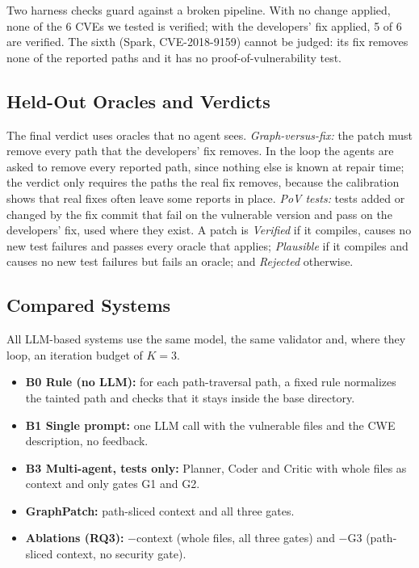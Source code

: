 \documentclass[conference]{IEEEtran}
\begin{document}
Two harness checks guard against a broken pipeline. With no change applied, none of the
6 CVEs we tested is verified; with the developers' fix applied, 5 of 6 are verified. The
sixth (Spark, CVE-2018-9159) cannot be judged: its fix removes none of the reported
paths and it has no proof-of-vulnerability test.

\subsection{Held-Out Oracles and Verdicts}
\label{sec:oracles}
The final verdict uses oracles that no agent sees. \emph{Graph-versus-fix:} the patch
must remove every path that the developers' fix removes. In the loop the agents are
asked to remove every reported path, since nothing else is known at repair time; the
verdict only requires the paths the real fix removes, because the calibration shows that
real fixes often leave some reports in place. \emph{PoV tests:} tests added or changed
by the fix commit that fail on the vulnerable version and pass on the developers' fix,
used where they exist. A patch is \emph{Verified} if it compiles, causes no new test
failures and passes every oracle that applies; \emph{Plausible} if it compiles and causes
no new test failures but fails an oracle; and \emph{Rejected} otherwise.

\subsection{Compared Systems}
All LLM-based systems use the same model, the same validator and, where they loop, an
iteration budget of $K=3$.
\begin{itemize}
\item \textbf{B0 Rule (no LLM):} for each path-traversal path, a fixed rule normalizes
the tainted path and checks that it stays inside the base directory.
\item \textbf{B1 Single prompt:} one LLM call with the vulnerable files and the CWE
description, no feedback.
\item \textbf{B3 Multi-agent, tests only:} Planner, Coder and Critic with whole files as
context and only gates G1 and G2.
\item \textbf{GraphPatch:} path-sliced context and all three gates.
\item \textbf{Ablations (RQ3):} $-$context (whole files, all three gates) and $-$G3
(path-sliced context, no security gate).
\end{itemize}
\end{document}
